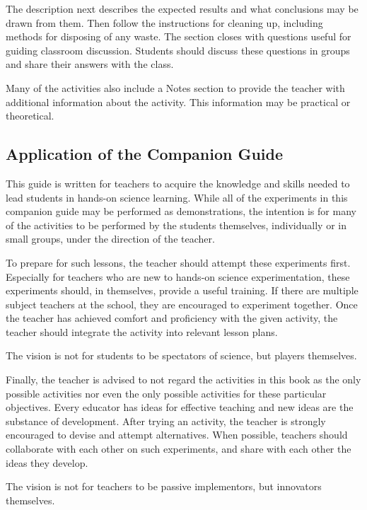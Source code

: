 The description next describes the expected results and what conclusions may be drawn from them. Then follow the instructions for cleaning up, including methods for disposing of any waste. The section closes with questions useful for guiding classroom discussion. Students should discuss these questions in groups and share their answers with the class.

Many of the activities also include a Notes section to provide the teacher with additional information about the activity. This information may be practical or theoretical.

\subsection{Application of the Companion Guide}

This guide is written for teachers to acquire the knowledge and skills needed to lead students in hands-on science learning. While all of the experiments in this companion guide may be performed as demonstrations, the intention is for many of the activities to be performed by the students themselves, individually or in small groups, under the direction of the teacher.

To prepare for such lessons, the teacher should attempt these experiments first. Especially for teachers who are new to hands-on science experimentation, these experiments should, in themselves, provide a useful training. If there are multiple subject teachers at the school, they are encouraged to experiment together. Once the teacher has achieved comfort and proficiency with the given activity, the teacher should integrate the activity into relevant lesson plans.

The vision is not for students to be spectators of science, but players themselves.

Finally, the teacher is advised to not regard the activities in this book as the only possible activities nor even the only possible activities for these particular objectives. Every educator has ideas for effective teaching and new ideas are the substance of development. After trying an activity, the teacher is strongly encouraged to devise and attempt alternatives. When possible, teachers should collaborate with each other on such experiments, and share with each other the ideas they develop.

The vision is not for teachers to be passive implementors, but innovators themselves.
